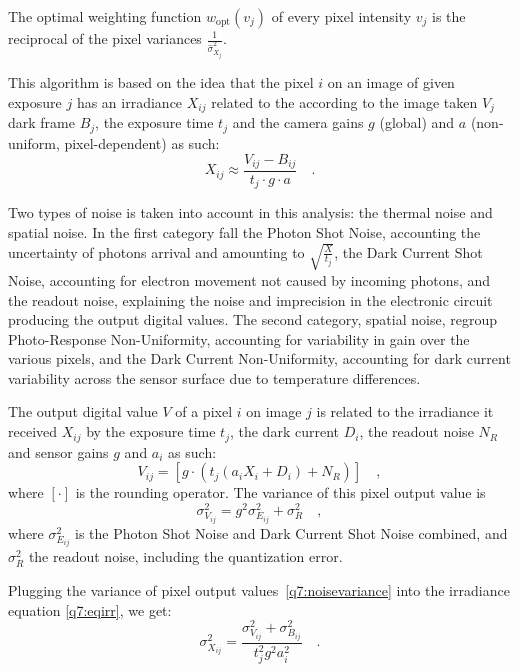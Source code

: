 \documentclass{report}
\begin{document}
The optimal weighting function $w_{\mathrm{opt}}\left(v_j\right)$ of every pixel intensity $v_j$ is the reciprocal of the pixel variances $\frac{1}{\hat{\sigma}_{X_j}^2}$.

This algorithm is based on the idea that the pixel $i$ on an image of given exposure $j$ has an irradiance $X_{ij}$ related to the according to the image taken $V_j$ dark frame $B_j$, the exposure time $t_j$ and the camera gains $g$ (global) and $a$ (non-uniform, pixel-dependent) as such:
\begin{equation}
\label{q7:eqirr}
X_{ij} \approx \frac{V_{ij} - B_{ij}}{t_j \cdot g \cdot a}
\quad.
\end{equation}

Two types of noise is taken into account in this analysis: the thermal noise and spatial noise. In the first category fall the Photon Shot Noise, accounting the uncertainty of photons arrival and amounting to $\sqrt{\frac{X}{t_j}}$, the Dark Current Shot Noise, accounting for electron movement not caused by incoming photons, and the readout noise, explaining the noise and imprecision in the electronic circuit producing the output digital values. The second category, spatial noise, regroup Photo-Response Non-Uniformity, accounting for variability in gain over the various pixels, and the Dark Current Non-Uniformity, accounting for dark current variability across the sensor surface due to temperature differences.

The output digital value $V$ of a pixel $i$ on image $j$ is related to the irradiance it received $X_{ij}$ by the exposure time $t_j$, the dark current $D_i$, the readout noise $N_R$ and sensor gains $g$ and $a_i$ as such:
\begin{equation}
V_{ij} = \left[ g \cdot \left( t_j \left( a_i X_i + D_i \right ) + N_R\right) \right] \quad,
\end{equation}
where $\left[ \cdot \right]$ is the rounding operator. The variance of this pixel output value is
\begin{equation}
\label{q7:noisevariance}
\sigma_{V_{ij}}^2 = g^2 \sigma_{E_{ij}}^2 + \sigma_R^2
\quad,
\end{equation}
where $\sigma_{E_{ij}}^2$ is the Photon Shot Noise and Dark Current Shot Noise combined, and $\sigma_R^2$ the readout noise, including the quantization error.

Plugging the variance of pixel output values~\eqref{q7:noisevariance} into the irradiance equation \eqref{q7:eqirr}, we get:
\begin{equation}
\sigma_{X_{ij}}^2 = \frac{\sigma_{V_{ij}}^2 + \sigma_{B_{ij}}^2}{t_j^2 g^2 a_i^2} \quad.
\end{equation}
\end{document}
